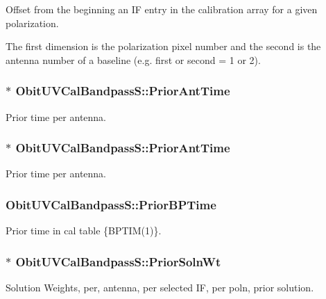 Offset from the beginning an IF entry in the calibration array for a given polarization. 

The first dimension is the polarization pixel number and the second is the antenna number of a baseline (e.g. first or second = 1 or 2). 
\subsubsection{$\ast$ {\bf Obit\-UVCal\-Bandpass\-S::Prior\-Ant\-Time}}\label{structObitUVCalBandpassS_o48}


Prior time per antenna. 

\subsubsection{$\ast$ {\bf Obit\-UVCal\-Bandpass\-S::Prior\-Ant\-Time}}\label{structObitUVCalBandpassS_o26}


Prior time per antenna. 

\subsubsection{ {\bf Obit\-UVCal\-Bandpass\-S::Prior\-BPTime}}\label{structObitUVCalBandpassS_o25}


Prior time in cal table \{BPTIM(1)\}. 

\subsubsection{$\ast$ {\bf Obit\-UVCal\-Bandpass\-S::Prior\-Soln\-Wt}}\label{structObitUVCalBandpassS_o53}


Solution Weights, per, antenna, per selected IF, per poln, prior solution. 

